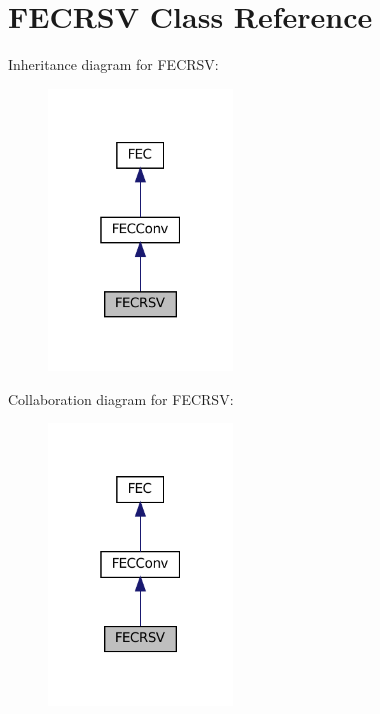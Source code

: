 \hypertarget{classFECRSV}{}\section{F\+E\+C\+R\+SV Class Reference}
\label{classFECRSV}


Inheritance diagram for F\+E\+C\+R\+SV\+:
\nopagebreak
\begin{figure}[H]
\begin{center}
\leavevmode
\includegraphics[width=139pt]{classFECRSV__inherit__graph}
\end{center}
\end{figure}


Collaboration diagram for F\+E\+C\+R\+SV\+:
\nopagebreak
\begin{figure}[H]
\begin{center}
\leavevmode
\includegraphics[width=139pt]{classFECRSV__coll__graph}
\end{center}
\end{figure}
